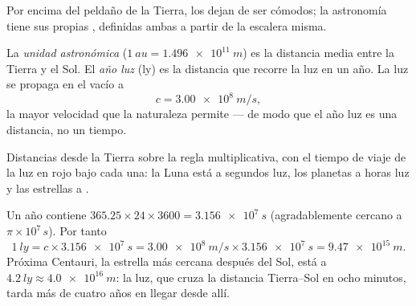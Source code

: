 Por encima del peldaño de la Tierra, los  dejan de ser cómodos; la
astronomía tiene sus propias , definidas ambas a partir de la
escalera misma.

\begin{definition}\label{def:g10:orders-of-magnitude:lightyear}
La \emph{unidad astronómica}
($\qty{1}{au} = \qty{1.496e11}{m}$) es la distancia media entre la
Tierra y el Sol. El \emph{año luz} (\unit{ly}) es la
distancia que recorre la luz en un año. La luz se propaga en el vacío a
\[
c = \qty{3.00e8}{m/s},
\]
la mayor velocidad que la naturaleza permite --- de modo que el año luz
es una distancia, no un tiempo.
\end{definition}

\begin{omfigure}

{\small Distancias desde la Tierra sobre la regla multiplicativa, con el
tiempo de viaje de la luz en rojo bajo cada una: la Luna está a segundos
luz, los planetas a horas luz y las estrellas a .}
\end{omfigure}

\begin{example}\label{ex:g10:orders-of-magnitude:ly}
Un año contiene $365.25 \times 24 \times 3600 = \qty{3.156e7}{s}$
(agradablemente cercano a $\pi \times 10^{7}\,\unit{s}$). Por tanto
\[
\qty{1}{ly} = c \times \qty{3.156e7}{s}
= \qty{3.00e8}{m/s} \times \qty{3.156e7}{s}
= \qty{9.47e15}{m}.
\]
Próxima Centauri, la estrella más cercana después del Sol, está a
$\qty{4.2}{ly} \approx \qty{4.0e16}{m}$: la luz, que cruza la distancia
Tierra--Sol en ocho minutos, tarda más de cuatro años en llegar desde
allí.
\end{example}

